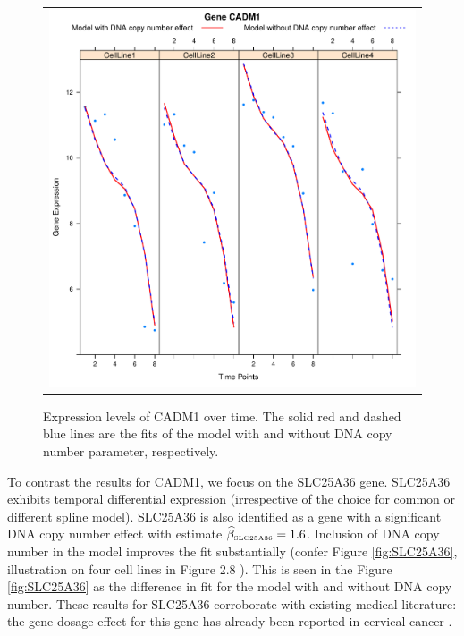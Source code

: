 \begin{figure}[h!]
\centering
\begin{tabular}{c}
\includegraphics[scale=0.55]{Figure5.pdf}
\end{tabular}
\caption{Expression levels of CADM1 over time. The solid red and dashed blue
 lines are the fits of the model with and without DNA copy number parameter, 
respectively.}
\label{fig:CADM1}
\end{figure}

To contrast the results for CADM1, we focus on the SLC25A36 gene. SLC25A36 exhibits temporal differential expression (irrespective of the choice for common or different spline model). SLC25A36 is also identified as a gene with a significant DNA copy number effect with estimate $\hat{\beta}_{\mbox{{\tiny SLC25A36}}} = 1.6$. Inclusion of DNA copy number in the model improves the fit substantially (confer Figure \ref{fig:SLC25A36}, illustration on four cell lines in Figure 2.8 \cite{Supp2018}). This is seen in the Figure \ref{fig:SLC25A36} as the difference in fit for the model with and without DNA copy number. These results for SLC25A36 corroborate with existing medical literature: the gene dosage effect for this gene has already been reported in cervical cancer \cite{Wilting2008}.

